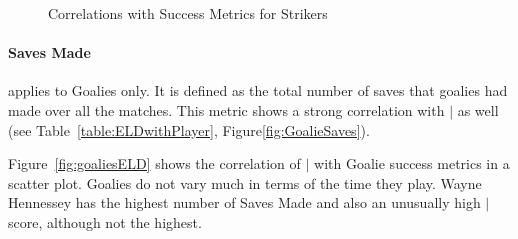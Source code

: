 {\begin{figure}
		\caption{Correlations with Success Metrics for Strikers \label{fig:strikersELD}}
	\end{figure}


	 
	\paragraph{Saves Made} applies to Goalies only. It is defined as the total number of saves that goalies had made over all the matches. This metric shows a strong correlation with $\mid$ as well (see Table~\ref{table:ELDwithPlayer}, Figure\ref{fig:GoalieSaves}).  
	
	Figure~\ref{fig:goaliesELD} shows the correlation of $\mid$ with Goalie success metrics in a scatter plot. Goalies do not vary much in terms of the time they play. Wayne Hennessey has the highest number of Saves Made and also an unusually high $\mid$ score, although not the highest.


}
